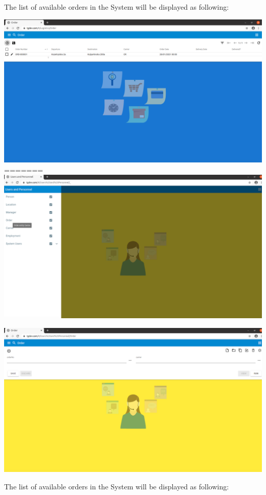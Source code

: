 The list of available orders in the System will be displayed as following:

\includegraphics[width=\textwidth]{sections/01-chapter/images/order13.png}
=======
\includegraphics[width=\textwidth]{sections/01-chapter/images/order1.png}


\includegraphics[width=\textwidth]{sections/01-chapter/images/order2.png}

The list of available orders in the System will be displayed as following:


